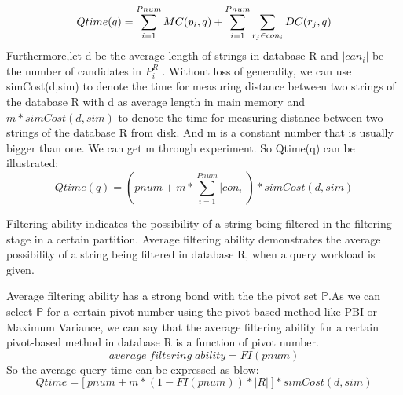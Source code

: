\documentclass{vldb}
\begin{document}
\begin{equation}Qtime(q)=\sum_{i=1}^{Pnum}MC(\mathnormal{p}_i,q)+ \sum_{i=1}^{Pnum}\sum_{r_j \in con_i}DC(r_j,q) \end{equation}
Furthermore,let d be the average length of strings in database R and $|can_i|$ be the number of candidates in $P_i^R$ . Without loss of generality, we can use simCost(d,sim) to denote the time for measuring distance between two strings of the database R with d as average length in main memory and $m*simCost(d,sim)$ to denote the time for measuring distance between two strings of the database R from disk. And m is a constant number that is usually bigger than one. We can get m through experiment. 
So  Qtime(q) can be illustrated:
\begin{equation}Qtime(q)=(pnum+ m* \sum_{i=1}^{Pnum}|con_i|)*simCost(d,sim)\end{equation}


\begin{myDef}
Filtering ability indicates the 
possibility of a string being filtered in the filtering stage in a certain partition. Average filtering ability demonstrates the average possibility of a string being filtered in database R, when a query workload is given. 
\end{myDef}
Average filtering ability has a strong bond with the the pivot set $\mathbb{P}$.As we can select $\mathbb{P}$ for a certain pivot number using the pivot-based method like PBI or Maximum Variance, we can say that the average filtering ability for a certain pivot-based method in database R is a function of pivot number.
\begin{equation}average \;filtering \;ability= FI(pnum)\end{equation}
So the average query time can be expressed as blow:
\begin{equation}Qtime=\lbrack \ pnum+m*(1-FI(pnum))*|R| \ \rbrack*simCost(d,sim)\end{equation}
\end{document}
